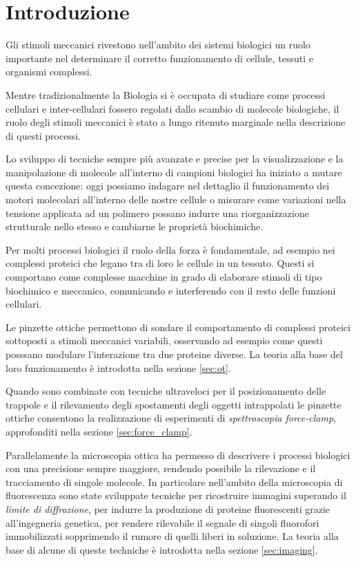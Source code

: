 \chapter{Introduzione}


Gli stimoli meccanici rivestono nell'ambito dei sistemi biologici un
ruolo importante nel determinare il corretto funzionamento di cellule,
tessuti e organismi complessi.

Mentre tradizionalmente la Biologia si è occupata di
studiare come processi cellulari e inter-cellulari fossero regolati
dallo scambio di molecole biologiche, il ruolo degli stimoli
meccanici è stato a lungo ritenuto marginale nella descrizione di
questi processi.

Lo sviluppo di tecniche sempre più avanzate e precise per la
visualizzazione e la manipolazione di molecole all'interno di campioni
biologici ha iniziato a mutare questa concezione: oggi possiamo
indagare nel dettaglio il funzionamento dei motori
molecolari all'interno delle nostre cellule o
misurare come variazioni nella tensione applicata ad un polimero
possano indurre una riorganizzazione strutturale nello stesso e 
cambiarne le proprietà biochimiche.

Per molti processi biologici il ruolo della forza è fondamentale,
ad esempio nei complessi proteici che legano tra di loro le cellule
in un tessuto. Questi si comportano come complesse macchine in grado
di elaborare stimoli di tipo biochimico e meccanico, comunicando e 
interferendo con il resto delle funzioni cellulari.

Le pinzette ottiche permettono di sondare il comportamento di
complessi proteici sottoposti a stimoli meccanici variabili, osservando
ad esempio come questi posssano modulare l'interazione tra due proteine
diverse. La teoria alla base del loro funzionamento è introdotta nella sezione \ref{sec:ot}.

Quando sono combinate con tecniche ultraveloci per il posizionamento
delle trappole e il rilevamento degli spostamenti degli oggetti intrappolati le pinzette ottiche consentono la realizzazione di esperimenti di \emph{spettroscopia force-clamp}, approfonditi nella sezione \ref{sec:force_clamp}.

Parallelamente la microscopia ottica ha permesso di descrivere i processi biologici con una precisione sempre maggiore, rendendo possibile la rilevazione e il tracciamento di singole molecole. In particolare
nell'ambito della microscopia di fluorescenza sono state sviluppate
tecniche per ricostruire immagini superando il \emph{limite di diffrazione}, per indurre la produzione di proteine fluorescenti grazie
all'ingegneria genetica, per rendere rilevabile il segnale di singoli fluorofori immobilizzati sopprimendo il rumore di quelli liberi in
soluzione. La teoria alla base di alcune di queste techniche è introdotta nella sezione \ref{sec:imaging}.

